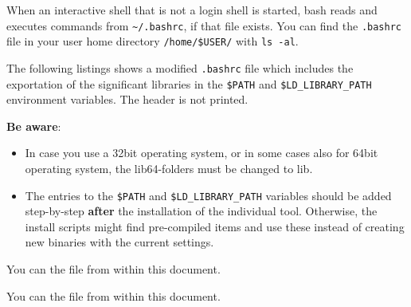 
	\label{sec:Build-script_Bashrc}

When an interactive shell that is not a login shell is started, bash reads and executes commands from \verb+~/.bashrc+, if that file exists. You can find the \verb+.bashrc+ file in your user home directory \verb+/home/$USER/+ with \verb+ls -al+.

The following listings shows a modified \verb+.bashrc+ file which includes the exportation of the significant libraries in the \verb+$PATH+ and \verb+$LD_LIBRARY_PATH+ environment variables. The header is not printed.

\textbf{Be aware}:

\begin{itemize}[noitemsep]
 \item In case you use a 32bit operating system, or in some cases also for 64bit operating system, the lib64-folders must be changed to lib.
 \item The entries to the \verb+$PATH+ and \verb+$LD_LIBRARY_PATH+ variables should be added step-by-step \textbf{after} the installation of the individual tool. Otherwise, the install scripts might find pre-compiled items and use these instead of creating new binaries with the current settings.
\end{itemize}


\begingroup
\lstset{breaklines = true}

\endgroup

\ifpdf
You can  the file from within this document.
\fi


\begingroup
\lstset{breaklines = true}

\endgroup

\ifpdf
You can  the file from within this document.
\fi